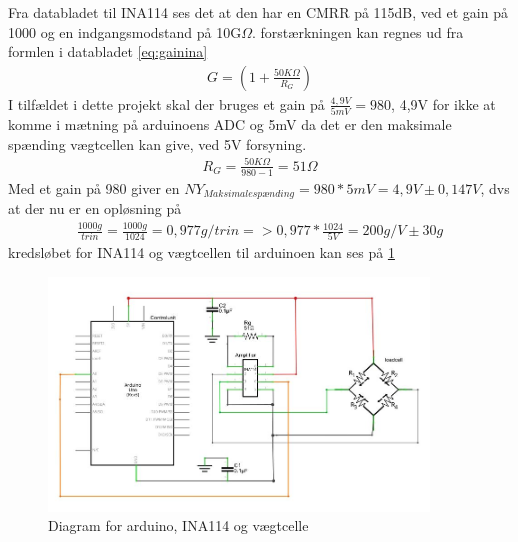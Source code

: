 Fra databladet til INA114 ses det at den har en CMRR på 115dB, ved et gain på 1000 og en indgangsmodstand på 10G$\Omega$. forstærkningen kan regnes ud fra formlen i databladet \ref{eq:gainina}
\begin{align}
 G=(1+\frac{50K\Omega}{R_{G}})
 \label{eq:gainina}
 \end{align} 
 I tilfældet i dette projekt skal der bruges et gain på $\frac{4,9V}{5mV}=980$, 4,9V for ikke at komme i mætning på arduinoens ADC og 5mV da det er den maksimale spænding vægtcellen kan give, ved 5V forsyning.
 \begin{align}
 R_{G}=\frac{50K\Omega}{980-1}=51\Omega
 \label{eq:gainina}
 \end{align}
Med et gain på 980 giver en $NY_{Maksimalespænding}=980*5mV=4,9V \pm0,147V$, dvs at der nu er en opløsning på
\begin{align}
 \frac{1000g}{trin}=\frac{1000g}{1024}=0,977g/trin=>0,977*\frac{1024}{5V}=200g/V \pm30g
 \label{eq:gainina}
 \end{align}
 kredsløbet for INA114 og vægtcellen til arduinoen kan ses på \ref{fig:loadcelldiagram}
 
  \begin{figure}[H]
	\centering
	\includegraphics[width=0.9\textwidth]{billeder/Hardware/diagrammer/loadcelldiagram.JPG}
	\caption{Diagram for arduino, INA114 og vægtcelle}
	\label{fig:loadcelldiagram}
\end{figure}

